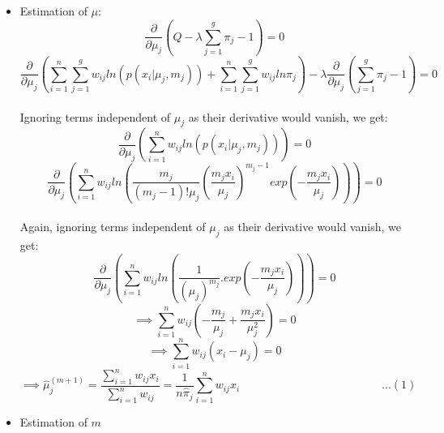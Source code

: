 \documentclass[12pt]{article}
\numberwithin{equation}{section}
\numberwithin{figure}{section}
\numberwithin{table}{section}
\begin{document}
\begin{itemize}
{}
\newpage
\normalsize
\item Estimation of $\mu$:\\
\begin{equation*}
\frac{\partial}{\partial\mu_j}\left( Q-\lambda\sum\limits_{j=1}^{g}\pi_j-1\right) = 0
\end{equation*}
\begin{equation*}
\frac{\partial}{\partial\mu_j}\left( 
\sum\limits_{i=1}^{n}\sum\limits_{j=1}^{g}w_{ij}ln(p(x_i|\mu_j,m_j)) + \sum\limits_{i=1}^{n}\sum\limits_{j=1}^{g}w_{ij}ln\pi_j
\right)
- \lambda\frac{\partial}{\partial\mu_j}\left(\sum\limits_{j=1}^{g}\pi_j-1\right) = 0
\end{equation*}
\\Ignoring terms independent of $\mu_j$ as their derivative would vanish, we get:\\
\begin{equation*}
\frac{\partial}{\partial\mu_j}\left( 
\sum\limits_{i=1}^{n}w_{ij}ln(p(x_i|\mu_j,m_j)) 
\right) = 0
\end{equation*}
\begin{equation*}
\frac{\partial}{\partial\mu_j}\left( 
\sum\limits_{i=1}^{n}w_{ij}ln\left(\frac{m_j}{(m_j-1)!\mu_j}(\frac{m_jx_i}{\mu_j})^{m_j-1}exp(-\frac{m_jx_i}{\mu_j})\right) 
\right) = 0
\end{equation*}
\\Again, ignoring terms independent of $\mu_j$ as their derivative would vanish, we get:\\
\begin{equation*}
\frac{\partial}{\partial\mu_j}\left( 
\sum\limits_{i=1}^{n}w_{ij}ln\left(\frac{1}{(\mu_j)^{m_j}}.exp(-\frac{m_jx_i}{\mu_j})\right) 
\right) = 0
\end{equation*}
\begin{equation*}
\implies \sum\limits_{i=1}^{n}w_{ij}\left(
-\frac{m_j}{\mu_j} + \frac{m_jx_i}{\mu_j^2}
\right) = 0 
\end{equation*}
\begin{equation*}
\implies \sum\limits_{i=1}^{n}w_{ij}\left(
x_i-\mu_j
\right) = 0 
\end{equation*}
{\large
\begin{equation*}
\implies \hat{\mu}_j^{(m+1)} = \frac{\sum\limits_{i=1}^{n}w_{ij}x_i}{\sum\limits_{i=1}^{n}w_{ij}} = \frac{1}{n\hat{\pi}_j}\sum\limits_{i=1}^{n}w_{ij}x_i \hspace{150pt} ... (1)
\end{equation*}
}
\newpage
\normalsize
\item Estimation of $m$\\

\end{itemize}
\end{document}
